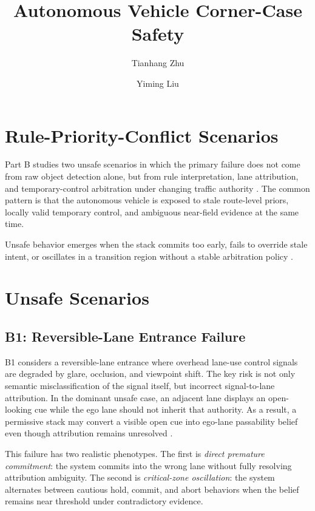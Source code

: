 \documentclass[sigconf,nonacm]{acmart}
\title{Autonomous Vehicle Corner-Case Safety}
\author{Tianhang Zhu}
\affiliation{
  \institution{EE495 Autonomous Vehicles}
  \city{Evanston}
  \country{USA}
}
\author{Yiming Liu}
\affiliation{
  \institution{EE495 Autonomous Vehicles}
  \city{Evanston}
  \country{USA}
}
\begin{document}
\maketitle

\section{Rule-Priority-Conflict Scenarios}

Part B studies two unsafe scenarios in which the primary failure does not come from raw object detection alone, but from rule interpretation, lane attribution, and temporary-control arbitration under changing traffic authority \cite{mutcd2023,manuel2020,veer2022}. The common pattern is that the autonomous vehicle is exposed to stale route-level priors, locally valid temporary control, and ambiguous near-field evidence at the same time.

Unsafe behavior emerges when the stack commits too early, fails to override stale intent, or oscillates in a transition region without a stable arbitration policy \cite{shalev2017}.

\section{Unsafe Scenarios}

\subsection{B1: Reversible-Lane Entrance Failure}

B1 considers a reversible-lane entrance where overhead lane-use control signals are degraded by glare, occlusion, and viewpoint shift. The key risk is not only semantic misclassification of the signal itself, but incorrect signal-to-lane attribution. In the dominant unsafe case, an adjacent lane displays an open-looking cue while the ego lane should not inherit that authority. As a result, a permissive stack may convert a visible open cue into ego-lane passability belief even though attribution remains unresolved \cite{behrendt2017,jensen2018,hirabayashi2019,monninger2023}.

This failure has two realistic phenotypes. The first is \emph{direct premature commitment}: the system commits into the wrong lane without fully resolving attribution ambiguity. The second is \emph{critical-zone oscillation}: the system alternates between cautious hold, commit, and abort behaviors when the belief remains near threshold under contradictory evidence.
\end{document}
